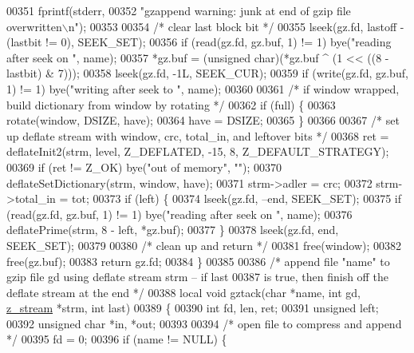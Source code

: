\begin{DoxyCode}
{00351         fprintf(stderr,
00352             \textcolor{stringliteral}{"gzappend warning: junk at end of gzip file overwritten\(\backslash\)n"});
00353 
00354     \textcolor{comment}{/* clear last block bit */}
00355     lseek(gz.fd, lastoff - (lastbit != 0), SEEK\_SET);
00356     \textcolor{keywordflow}{if} (read(gz.fd, gz.buf, 1) != 1) bye(\textcolor{stringliteral}{"reading after seek on "}, name);
00357     *gz.buf = (\textcolor{keywordtype}{unsigned} char)(*gz.buf ^ (1 << ((8 - lastbit) & 7)));
00358     lseek(gz.fd, -1L, SEEK\_CUR);
00359     \textcolor{keywordflow}{if} (write(gz.fd, gz.buf, 1) != 1) bye(\textcolor{stringliteral}{"writing after seek to "}, name);
00360 
00361     \textcolor{comment}{/* if window wrapped, build dictionary from window by rotating */}
00362     \textcolor{keywordflow}{if} (full) \{
00363         rotate(window, DSIZE, have);
00364         have = DSIZE;
00365     \}
00366 
00367     \textcolor{comment}{/* set up deflate stream with window, crc, total\_in, and leftover bits */}
00368     ret = deflateInit2(strm, level, Z\_DEFLATED, -15, 8, Z\_DEFAULT\_STRATEGY);
00369     \textcolor{keywordflow}{if} (ret != Z\_OK) bye(\textcolor{stringliteral}{"out of memory"}, \textcolor{stringliteral}{""});
00370     deflateSetDictionary(strm, window, have);
00371     strm->adler = crc;
00372     strm->total\_in = tot;
00373     \textcolor{keywordflow}{if} (left) \{
00374         lseek(gz.fd, --end, SEEK\_SET);
00375         \textcolor{keywordflow}{if} (read(gz.fd, gz.buf, 1) != 1) bye(\textcolor{stringliteral}{"reading after seek on "}, name);
00376         deflatePrime(strm, 8 - left, *gz.buf);
00377     \}
00378     lseek(gz.fd, end, SEEK\_SET);
00379 
00380     \textcolor{comment}{/* clean up and return */}
00381     free(window);
00382     free(gz.buf);
00383     \textcolor{keywordflow}{return} gz.fd;
00384 \}
00385 
00386 \textcolor{comment}{/* append file "name" to gzip file gd using deflate stream strm -- if last}
00387 \textcolor{comment}{   is true, then finish off the deflate stream at the end */}
00388 local \textcolor{keywordtype}{void} gztack(\textcolor{keywordtype}{char} *name, \textcolor{keywordtype}{int} gd, \hyperlink{structz__stream__s}{z\_stream} *strm, \textcolor{keywordtype}{int} last)
00389 \{
00390     \textcolor{keywordtype}{int} fd, len, ret;
00391     \textcolor{keywordtype}{unsigned} left;
00392     \textcolor{keywordtype}{unsigned} \textcolor{keywordtype}{char} *in, *out;
00393 
00394     \textcolor{comment}{/* open file to compress and append */}
00395     fd = 0;
00396     \textcolor{keywordflow}{if} (name != NULL) \{
}
\end{DoxyCode}
